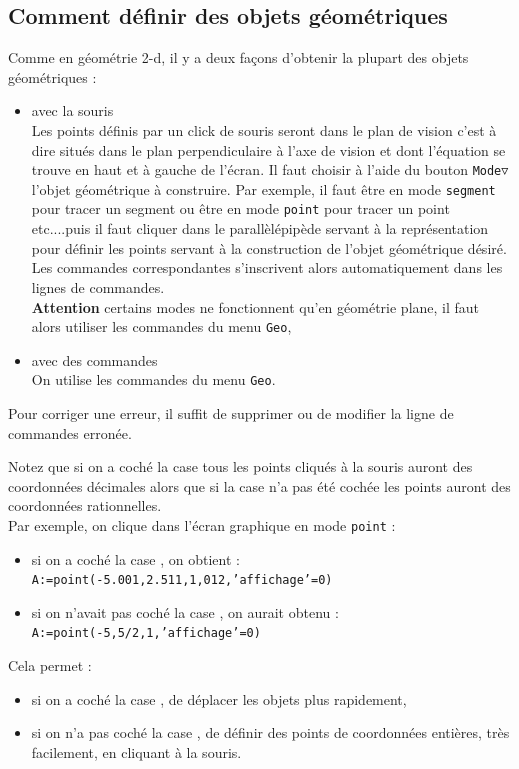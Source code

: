 \documentclass[a4paper,11pt]{article}
\begin{document}
\subsection{Comment d\'efinir des objets g\'eom\'etriques}
Comme en g\'eom\'etrie 2-d, il y a deux fa\c{c}ons 
d'obtenir la plupart des objets 
g\'eom\'etriques :
\begin{itemize}
\item avec la souris\\
Les points d\'efinis par un click de souris seront dans le plan de vision
c'est \`a dire situ\'es dans le plan perpendiculaire \`a l'axe de vision et 
dont l'\'equation se trouve en haut et \`a gauche de l'\'ecran.
Il faut choisir \`a l'aide du bouton {\tt Mode$\triangledown$} l'objet 
g\'eom\'etrique \`a construire. Par exemple, il faut  \^etre en mode 
{\tt segment} pour tracer un segment ou \^etre en mode {\tt point} pour 
tracer un point etc....puis il faut cliquer dans le
parall\`el\'epip\`ede servant \`a la repr\'esentation pour d\'efinir les points
servant \`a la construction de l'objet 
g\'eom\'etrique d\'esir\'e. 
Les commandes correspondantes s'inscrivent alors
automatiquement dans les lignes de commandes.\\
{\bf Attention} certains modes ne fonctionnent qu'en g\'eom\'etrie plane, il 
faut alors  utiliser les commandes du menu {\tt Geo}, 
\item avec des commandes\\
On utilise les commandes du menu {\tt Geo}.
\end{itemize}
Pour corriger une erreur, il suffit de 
supprimer ou de modifier la ligne de commandes erron\'ee.

Notez que si on a coch\'e la case \framebox{$\sim$}\index{$\sim$} tous les 
points cliqu\'es \`a la souris auront des 
coordonn\'ees d\'ecimales alors que si la case \framebox{$\sim$} n'a pas 
\'et\'e coch\'ee les points auront des coordonn\'ees rationnelles.\\
Par exemple, on clique dans l'\'ecran graphique en mode {\tt point} :
\begin{itemize}
\item si on a coch\'e  la case  \framebox{$\sim$}, on obtient :\\
{\tt A:=point(-5.001,2.511,1,012,'affichage'=0)}
\item
si on n'avait pas coch\'e  la case \framebox{$\sim$}, on aurait obtenu :\\
{\tt A:=point(-5,5/2,1,'affichage'=0)}
\end{itemize}
Cela permet :
\begin{itemize}
\item si on a coch\'e  la case  \framebox{$\sim$},
 de d\'eplacer les objets plus rapidement,
\item si on n'a pas coch\'e la case \framebox{$\sim$}, de d\'efinir des points 
de coordonn\'ees enti\`eres, tr\`es facilement, en cliquant \`a la souris.
\end{itemize}
\end{document}
